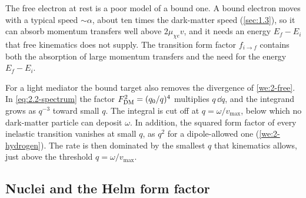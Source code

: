 \noindent The free electron at rest is a poor model of a bound one. A bound electron moves with a typical speed $\sim\alpha$, about ten times the dark-matter speed (\cref{sec:1.3}), so it can absorb momentum transfers well above $2\mu_{\chi e}v$, and it needs an energy $E_f - E_i$ that free kinematics does not supply. The transition form factor $f_{i\to f}$ contains both the absorption of large momentum transfers and the need for the energy $E_f - E_i$.

For a light mediator the bound target also removes the divergence of \cref{we:2-free}. In \cref{eq:2.2-spectrum} the factor $F_{\mathrm{DM}}^2 = (q_0/q)^4$ multiplies $q\,\dd q$, and the integrand grows as $q^{-3}$ toward small $q$. The integral is cut off at $q = \omega/v_{\mathrm{max}}$, below which no dark-matter particle can deposit $\omega$. In addition, the squared form factor of every inelastic transition vanishes at small $q$, as $q^2$ for a dipole-allowed one (\cref{we:2-hydrogen}). The rate is then dominated by the smallest $q$ that kinematics allows, just above the threshold $q = \omega/v_{\mathrm{max}}$.

\subsection{Nuclei and the Helm form factor}

